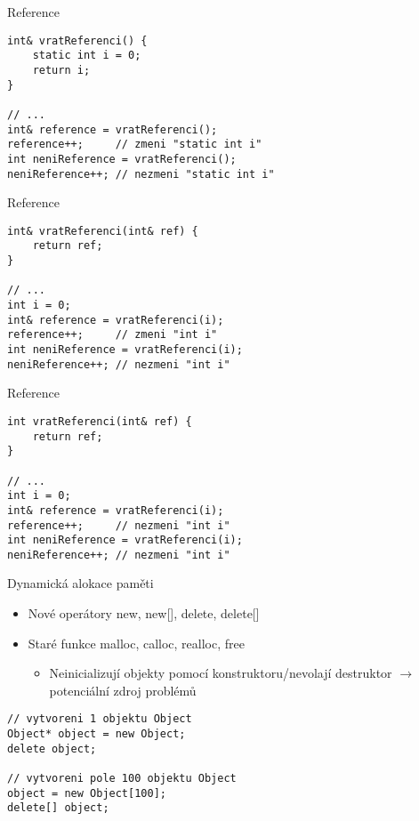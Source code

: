 \begin{frame}[fragile]
\begin{exampleblock}{Reference}
\begin{lstlisting}
int& vratReferenci() {
	static int i = 0;
	return i;
}

// ...
int& reference = vratReferenci();
reference++;     // zmeni "static int i"
int neniReference = vratReferenci();
neniReference++; // nezmeni "static int i"
\end{lstlisting}
\end{exampleblock}
\end{frame}


\begin{frame}[fragile]
\begin{exampleblock}{Reference}
\begin{lstlisting}
int& vratReferenci(int& ref) {
	return ref;
}

// ...
int i = 0;
int& reference = vratReferenci(i);
reference++;     // zmeni "int i"
int neniReference = vratReferenci(i);
neniReference++; // nezmeni "int i"
\end{lstlisting}
\end{exampleblock}
\end{frame}


\begin{frame}[fragile]
\begin{exampleblock}{Reference}
\begin{lstlisting}
int vratReferenci(int& ref) {
	return ref;
}

// ...
int i = 0;
int& reference = vratReferenci(i);
reference++;     // nezmeni "int i"
int neniReference = vratReferenci(i);
neniReference++; // nezmeni "int i"
\end{lstlisting}
\end{exampleblock}
\end{frame}




\begin{frame}[fragile]
\begin{block}{Dynamická alokace paměti}
\begin{itemize}
\item Nové operátory new, new[], delete, delete[]
\item Staré funkce malloc, calloc, realloc, free
 \begin{itemize}
 \item Neinicializují objekty pomocí konstruktoru/nevolají destruktor $\rightarrow$ potenciální zdroj problémů
 \end{itemize}
\end{itemize}
\end{block}
\begin{exampleblock}{}
\begin{lstlisting}
// vytvoreni 1 objektu Object
Object* object = new Object;
delete object;

// vytvoreni pole 100 objektu Object
object = new Object[100];
delete[] object;
\end{lstlisting}
\end{exampleblock}
\end{frame}


